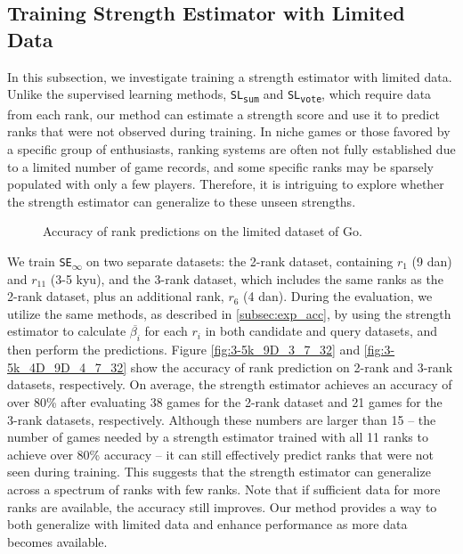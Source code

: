 \subsection{Training Strength Estimator with Limited Data}
\label{subsec:exp_few_rank}
In this subsection, we investigate training a strength estimator with limited data.
Unlike the supervised learning methods, \texttt{SL\textsubscript{sum}} and \texttt{SL\textsubscript{vote}}, which require data from each rank, our method can estimate a strength score and use it to predict ranks that were not observed during training.
In niche games or those favored by a specific group of enthusiasts, ranking systems are often not fully established due to a limited number of game records, and some specific ranks may be sparsely populated with only a few players.
Therefore, it is intriguing to explore whether the strength estimator can generalize to these unseen strengths.

\begin{figure}[h]
    \centering
    \caption{Accuracy of rank predictions on the limited dataset of Go.}
    \label{fig:future_analysis}
\end{figure}

We train \texttt{SE\textsubscript{$\infty$}} on two separate datasets: the 2-rank dataset, containing $r_1$ (9 dan) and $r_{11}$ (3-5 kyu), and the 3-rank dataset, which includes the same ranks as the 2-rank dataset, plus an additional rank, $r_6$ (4 dan).
During the evaluation, we utilize the same methods, as described in \ref{subsec:exp_acc}, by using the strength estimator to calculate $\overline{\beta_i}$ for each $r_i$ in both candidate and query datasets, and then perform the predictions.
Figure \ref{fig:3-5k_9D_3_7_32} and \ref{fig:3-5k_4D_9D_4_7_32} show the accuracy of rank prediction on 2-rank and 3-rank datasets, respectively.
On average, the strength estimator achieves an accuracy of over 80\% after evaluating 38 games for the 2-rank dataset and 21 games for the 3-rank datasets, respectively.
Although these numbers are larger than 15 -- the number of games needed by a strength estimator trained with all 11 ranks to achieve over 80\% accuracy -- it can still effectively predict ranks that were not seen during training.
This suggests that the strength estimator can generalize across a spectrum of ranks with few ranks.
Note that if sufficient data for more ranks are available, the accuracy still improves.
Our method provides a way to both generalize with limited data and enhance performance as more data becomes available.


